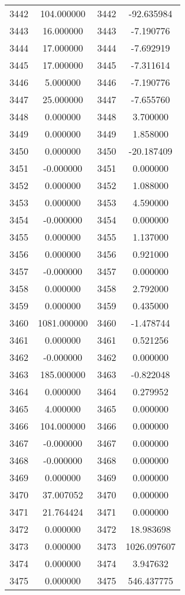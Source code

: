\documentclass[12pt]{article}
\begin{document}
\begin{longtable}{@{}cccc@{}}
3442 & 104.000000 & 3442 & -92.635984 \\
3443 & 16.000000 & 3443 & -7.190776 \\
3444 & 17.000000 & 3444 & -7.692919 \\
3445 & 17.000000 & 3445 & -7.311614 \\
3446 & 5.000000 & 3446 & -7.190776 \\
3447 & 25.000000 & 3447 & -7.655760 \\
3448 & 0.000000 & 3448 & 3.700000 \\
3449 & 0.000000 & 3449 & 1.858000 \\
3450 & 0.000000 & 3450 & -20.187409 \\
3451 & -0.000000 & 3451 & 0.000000 \\
3452 & 0.000000 & 3452 & 1.088000 \\
3453 & 0.000000 & 3453 & 4.590000 \\
3454 & -0.000000 & 3454 & 0.000000 \\
3455 & 0.000000 & 3455 & 1.137000 \\
3456 & 0.000000 & 3456 & 0.921000 \\
3457 & -0.000000 & 3457 & 0.000000 \\
3458 & 0.000000 & 3458 & 2.792000 \\
3459 & 0.000000 & 3459 & 0.435000 \\
3460 & 1081.000000 & 3460 & -1.478744 \\
3461 & 0.000000 & 3461 & 0.521256 \\
3462 & -0.000000 & 3462 & 0.000000 \\
3463 & 185.000000 & 3463 & -0.822048 \\
3464 & 0.000000 & 3464 & 0.279952 \\
3465 & 4.000000 & 3465 & 0.000000 \\
3466 & 104.000000 & 3466 & 0.000000 \\
3467 & -0.000000 & 3467 & 0.000000 \\
3468 & -0.000000 & 3468 & 0.000000 \\
3469 & 0.000000 & 3469 & 0.000000 \\
3470 & 37.007052 & 3470 & 0.000000 \\
3471 & 21.764424 & 3471 & 0.000000 \\
3472 & 0.000000 & 3472 & 18.983698 \\
3473 & 0.000000 & 3473 & 1026.097607 \\
3474 & 0.000000 & 3474 & 3.947632 \\
3475 & 0.000000 & 3475 & 546.437775 \\

\end{longtable}
\end{document}

